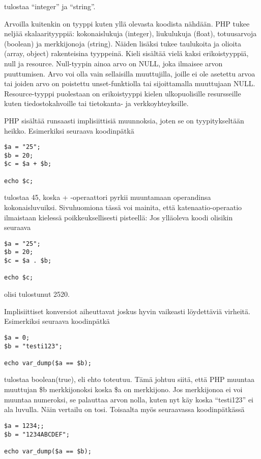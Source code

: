 tulostaa “integer” ja “string”.
\par
Arvoilla kuitenkin on tyyppi kuten yllä olevasta koodista nähdään. PHP tukee neljää skalaarityyppiä: kokonaislukuja (integer), liukulukuja (float), totuusarvoja (boolean) ja merkkijonoja (string). Näiden lisäksi tukee taulukoita ja olioita (array, object) rakenteisina tyyppeinä. Kieli sisältää vielä kaksi erikoistyyppiä, null ja resource. Null-tyypin ainoa arvo on NULL, joka ilmaisee arvon puuttumisen. Arvo voi olla vain sellaisilla muuttujilla, joille ei ole asetettu arvoa tai joiden arvo on poistettu unset-funktiolla tai sijoittamalla muuttujaan NULL. Resource-tyyppi puolestaan on erikoistyyppi kielen ulkopuolisille resursseille kuten tiedostokahvoille tai tietokanta- ja verkkoyhteyksille.
\par
PHP sisältää runsaasti implisiittisiä muunnoksia, joten se on tyypitykseltään heikko. Esimerkiksi seuraava koodinpätkä

\begin{lstlisting}
$a = "25";
$b = 20;
$c = $a + $b;

echo $c;
\end{lstlisting}

tulostaa 45, koska + -operaattori pyrkii muuntamaan operandinsa kokonaisluvuiksi. Sivuhuomiona tässä voi mainita, että katenaatio-operaatio ilmaistaan kielessä poikkeuksellisesti pisteellä: Jos ylläoleva koodi olisikin seuraava

\begin{lstlisting}
$a = "25";
$b = 20;
$c = $a . $b;

echo $c;
\end{lstlisting}

olisi tulostunut 2520.
\par
Implisiittiset konversiot aiheuttavat joskus hyvin vaikeasti löydettäviä virheitä. Esimerkiksi seuraava koodinpätkä

\begin{lstlisting}
$a = 0;
$b = "testi123";

echo var_dump($a == $b);
\end{lstlisting}

tulostaa boolean(true), eli ehto toteutuu. Tämä johtuu siitä, että PHP muuntaa muuttujan \$b merkkijonoksi koska \$a on merkkijono. Jos merkkijonoa ei voi muuntaa numeroksi, se palauttaa arvon nolla, kuten nyt käy koska “testi123” ei ala luvulla. Näin vertailu on tosi. Toisaalta myös seuraavassa koodinpätkässä

\begin{lstlisting}
$a = 1234;;
$b = "1234ABCDEF";

echo var_dump($a == $b);
\end{lstlisting}

